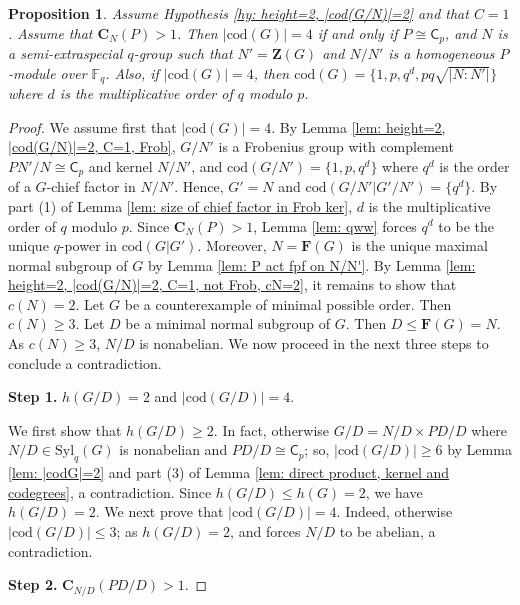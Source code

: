 \documentclass[9pt]{article}
\newtheorem{prop}[lem]{\bf Proposition}
\begin{document}
\begin{prop}\label{prop: height=2, |cod(G/N)|=2, C=1, not Frob}
	Assume Hypothesis \ref{hy: height=2, |cod(G/N)|=2} and that $C=1$.
    Assume that 
	$\mathbf{C}_{N}(P)>1$.
    Then $|\mathrm{cod}(G)|=4$ if and only if $P\cong \mathsf{C}_{p}$, and $N$ is a semi-extraspecial $q$-group such that $N'=\mathbf{Z}(G)$ and $N/N'$ is a homogeneous $P$-module over $\mathbb{F}_q$.
	Also, if $|\mathrm{cod}(G)|=4$, then $\mathrm{cod}(G)=\{ 1,p,q^{d}, pq \sqrt{|N:N'|} \}$ where 
	$d$ is the multiplicative order of $q$ modulo $p$.  
\end{prop}
\begin{proof}
	We assume first that $|\mathrm{cod}(G)|=4$.
    By Lemma \ref{lem: height=2, |cod(G/N)|=2, C=1, Frob},
    $G/N'$ is a Frobenius group with complement $PN'/N\cong \mathsf{C}_{p}$ and kernel $N/N'$, and $\mathrm{cod}(G/N')=\{ 1,p,q^{d} \}$ where $q^{d}$ is the order of a $G$-chief factor in $N/N'$.
    Hence, $G'=N$ and $\mathrm{cod}(G/N'|G'/N')=\{ q^d \}$.
    By part (1) of Lemma \ref{lem: size of chief factor in Frob ker}, $d$ is the multiplicative order of $q$ modulo $p$.
    Since $\mathbf{C}_{N}(P)>1$, Lemma \ref{lem: qww} forces $q^{d}$ to be the unique $q$-power
	in $\mathrm{cod}(G|G')$.
	Moreover, $N=\mathbf{F}(G)$ is the unique maximal normal subgroup of $G$ by Lemma \ref{lem: P act fpf on N/N'}.
 By Lemma \ref{lem: height=2, |cod(G/N)|=2, C=1, not Frob, cN=2}, it remains to show that $c(N)=2$.
 Let $G$ be a counterexample of minimal possible order.
  Then $c(N)\geq 3$.
  Let $D$ be a minimal normal subgroup of $G$.
  Then $D\leq \mathbf{F}(G)=N$.
    As $c(N)\geq 3$, $N/D$ is nonabelian.
	We now proceed in the next three steps to conclude a contradiction.
	

 \textbf{Step 1.} $h(G/D)=2$ and $|\mathrm{cod}(G/D)|=4$.

 

  We first show that $h(G/D)\geq 2$.
  In fact, otherwise $G/D=N/D\times PD/D$ where $N/D\in \mathrm{Syl}_{q}(G)$ is nonabelian and $PD/D\cong \mathsf{C}_{p}$;
  so, $|\mathrm{cod}(G/D)|\geq 6$ by Lemma \ref{lem: |codG|=2} and part (3) of Lemma \ref{lem: direct product, kernel and codegrees}, a contradiction.
  Since $h(G/D)\leq h(G)=2$, we have $h(G/D)=2$.
  We next prove that $|\mathrm{cod}(G/D)|=4$.
  Indeed, otherwise $|\mathrm{cod}(G/D)|\leq 3$;
  as $h(G/D)=2$, \cite[Theorem 3.4]{alizadeh2019}
  and \cite[Theorem 0.1]{alizadeh2022} forces $N/D$ to be abelian, a contradiction.
 
 
 \textbf{Step 2.} $\mathbf{C}_{N/D}(PD/D)>1$.




\end{proof}
\end{document}
